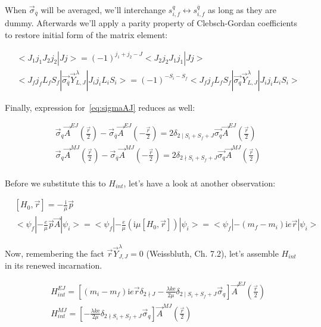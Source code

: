 When $\vec{\sigma}_{\overline{q}}$ will be averaged, we'll interchange $s^q_{i,f} \leftrightarrow s_{i,f}^{\overline{q}}$ as long as they are dummy. Afterwards we'll apply a parity property of Clebsch-Gordan coefficients to restore initial form of the matrix element:

\begin{align}
    &<J_1 j_1 J_2 j_2 | J j> = (-1)^{j_1 + j_2 - J} <J_2 j_2 J_1 j_1 | J j> \\
    &<J_f j_f L_f S_f| \vec{\sigma_{\overline{q}}} \vec{Y}_{L, J}^\lambda |J_i j_i L_i S_i> = (-1)^{-S_i - S_f} <J_f j_f L_f S_f| \vec{\sigma_{q}} \vec{Y}_{L, J}^\lambda |J_i j_i L_i S_i>
\end{align}

Finally, expression for~\cref{eq:sigmaAJ} reduces as well:

\begin{align}
    &\vec{\sigma}_{q} \vec{A}^{EJ}(\frac{\vec{r}}{2}) - \vec{\sigma}_{\overline{q}} \vec{A}^{EJ}(-\frac{\vec{r}}{2}) = 2 \delta_{2 \mid S_i + S_f + J} \vec{\sigma_{q}} \vec{A}^{EJ}(\frac{\vec{r}}{2}) \\
    &\vec{\sigma}_{q} \vec{A}^{MJ}(\frac{\vec{r}}{2}) - \vec{\sigma}_{\overline{q}} \vec{A}^{MJ}(-\frac{\vec{r}}{2}) = 2 \delta_{2 \nmid S_i + S_f + J} \vec{\sigma_{q}} \vec{A}^{MJ}(\frac{\vec{r}}{2}) \\
\end{align}

Before we substitute this to $H_{int}$, let's have a look at another observation:

\begin{align}
    &[H_0, \vec{r}] = -\frac{\mathrm{i}}{\mu} \vec{p} \\
    &<\psi_f| -\frac{e}{\mu} \vec{p} \vec{A} |\psi_i> = <\psi_f| -\frac{e}{\mu} \left( \mathrm{i} \mu [H_0, \vec{r}]  \right) |\psi_i> = <\psi_f| -(m_f - m_i) \mathrm{i} e \vec{r} |\psi_i>
\end{align}

Now, remembering the fact $\vec{r} \vec{Y}^\lambda_{J, J} = 0$ (Weissbluth, Ch. 7.2)\cite{weissbluth}, let's assemble $H_{int}$ in its renewed incarnation.

\begin{align}
    &H_{int}^{EJ} = \left[(m_i - m_f) \mathrm{i} e \vec{r} \delta_{2 \nmid J} - \frac{\lambda k \mathrm{e}}{2 \mu} \delta_{2 \mid S_i + S_f + J} \vec{\sigma}_{q} \right] \vec{A}^{EJ}(\frac{\vec{r}}{2}) \\
    &H_{int}^{MJ} = \left[ -\frac{\lambda k \mathrm{e}}{2 \mu} \delta_{2 \nmid S_i + S_f + J} \vec{\sigma}_{q} \right] \vec{A}^{MJ}(\frac{\vec{r}}{2})
\end{align}

